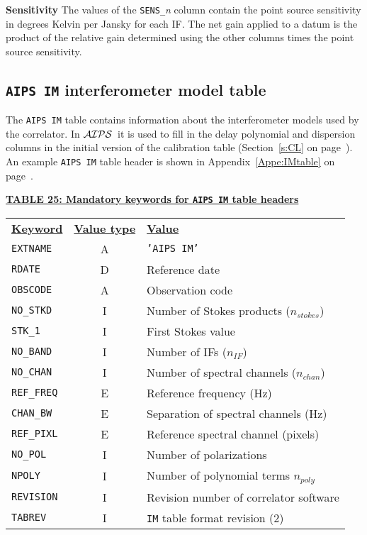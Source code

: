 \documentclass[twoside]{article}
\newcommand{\AIPS}{{$\cal AIPS\/$}}
\newcommand{\nstokes}{$n_{stokes}$}
\newcommand{\nif}{$n_{IF}$}
\newcommand{\nchan}{$n_{chan}$}
\newcommand{\npoly}{$n_{poly}$}
\begin{document}
{\bf Sensitivity}  The values of the {\tt SENS\_}{\it n} column
contain the point source sensitivity in degrees Kelvin per Jansky for
each IF\@.   The net gain applied to a datum is the product of the
relative gain determined using the other columns times the point
source sensitivity.


\subsection{{\tt AIPS IM} interferometer model table}
\label{s:IM}

The {\tt AIPS IM} table contains information about the interferometer
models used by the correlator.  In \AIPS\ it is used to fill in the
delay polynomial and dispersion columns in the initial version of the
calibration table (Section~\ref{s:CL} on page~\pageref{s:CL}).
An example {\tt AIPS IM} table header is shown in
Appendix~\ref{Appe:IMtable} on page~\pageref{Appe:IMtable}.

\begin{center}
\underline{\bf{TABLE 25: Mandatory keywords for {\tt AIPS IM} table
    headers}}\\
\begin{tabular}{lcl}
\noalign{\vspace{2pt}} \label{ta:IMkeys}
\underline{{\bf Keyword}} & \underline{\bf{Value type}} &
    \underline{\bf{Value\vphantom{y}}} \\
\noalign{\vspace{2pt}}
{\tt EXTNAME}   & A & {\tt 'AIPS IM'}  \\
{\tt RDATE}     & D & Reference date \\
{\tt OBSCODE}   & A & Observation code \\
{\tt NO\_STKD}  & I & Number of Stokes products (\nstokes) \\
{\tt STK\_1}    & I & First Stokes value \\
{\tt NO\_BAND}  & I & Number of IFs (\nif)\\
{\tt NO\_CHAN}  & I & Number of spectral channels (\nchan) \\
{\tt REF\_FREQ} & E & Reference frequency (Hz) \\
{\tt CHAN\_BW}  & E & Separation of spectral channels (Hz) \\
{\tt REF\_PIXL} & E & Reference spectral channel (pixels) \\
{\tt NO\_POL}   & I & Number of polarizations \\
{\tt NPOLY}     & I & Number of polynomial terms \npoly \\
{\tt REVISION}  & I & Revision number of correlator software \\
{\tt TABREV}    & I & {\tt IM} table format revision (2)
\end{tabular}
\end{center}
\end{document}
